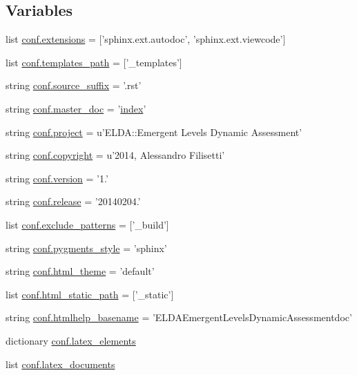 \subsection*{Variables}
\begin{DoxyCompactItemize}
\item 
list \hyperlink{a00132_ae475e080536acb271a0a0efe56c3ba42}{conf.\-extensions} = \mbox{[}'sphinx.\-ext.\-autodoc', 'sphinx.\-ext.\-viewcode'\mbox{]}
\item 
list \hyperlink{a00132_ae850ae634911b713e036b43894fdd525}{conf.\-templates\-\_\-path} = \mbox{[}'\-\_\-templates'\mbox{]}
\item 
string \hyperlink{a00132_a10af2a769eb3bd3322e874f677e435b1}{conf.\-source\-\_\-suffix} = '.rst'
\item 
string \hyperlink{a00132_a6fcd7e5236f355b1e1a55f9d95988810}{conf.\-master\-\_\-doc} = '\hyperlink{a00102_a0cd6a44ffb07342cbc7e5ac33bfc9495}{index}'
\item 
string \hyperlink{a00132_a45653c983098153b78e33600e39230eb}{conf.\-project} = u'E\-L\-D\-A\-::\-Emergent Levels Dynamic Assessment'
\item 
string \hyperlink{a00132_a33fa97cf51dcb25970fbf53f10159589}{conf.\-copyright} = u'2014, Alessandro Filisetti'
\item 
string \hyperlink{a00132_ade15c5b54093b64d7c428ec19ca5b1cb}{conf.\-version} = '1.'
\item 
string \hyperlink{a00132_a325dc746d8bf05c54d26351c35a21d90}{conf.\-release} = '20140204.'
\item 
list \hyperlink{a00132_a7ad48fb6f3e9b129c02346ea0d3527c1}{conf.\-exclude\-\_\-patterns} = \mbox{[}'\-\_\-build'\mbox{]}
\item 
string \hyperlink{a00132_a641130e096b26cba8a5d63ed38684de7}{conf.\-pygments\-\_\-style} = 'sphinx'
\item 
string \hyperlink{a00132_a6c3bfcc1a44546c1c75ce20f55bd0fd6}{conf.\-html\-\_\-theme} = 'default'
\item 
list \hyperlink{a00132_af4fb5d8851ccaade135c2668dd3ced41}{conf.\-html\-\_\-static\-\_\-path} = \mbox{[}'\-\_\-static'\mbox{]}
\item 
string \hyperlink{a00132_aab7fddb2766ce3c430d8246fbfdbc7b1}{conf.\-htmlhelp\-\_\-basename} = 'E\-L\-D\-A\-Emergent\-Levels\-Dynamic\-Assessmentdoc'
\item 
dictionary \hyperlink{a00132_a33619d385ad23765ac6ebb58bf82d43d}{conf.\-latex\-\_\-elements}
\item 
list \hyperlink{a00132_a7812f49970f3de0d15dd7b9b9a10e3a1}{conf.\-latex\-\_\-documents}

\end{DoxyCompactItemize}
